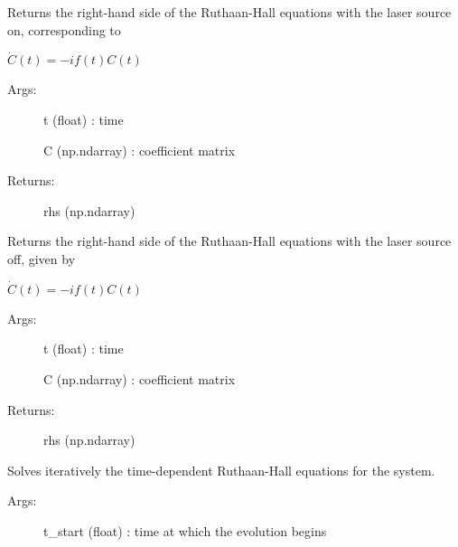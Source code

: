 \documentclass[letterpaper,10pt,english]{sphinxmanual}
\begin{document}
\begin{fulllineitems}
\begin{fulllineitems}
\end{fulllineitems}


\begin{fulllineitems}
\label{\detokenize{index:do.GHF.rhsf}}
Returns the right-hand side of the Ruthaan-Hall equations with the laser source on, corresponding to

\(\dot{C}(t) = -i f(t)C(t)\)
\begin{description}
\item[{Args:}] \leavevmode
t (float) : time

C (np.ndarray) : coefficient matrix

\item[{Returns:}] \leavevmode
rhs (np.ndarray)

\end{description}

\end{fulllineitems}


\begin{fulllineitems}
\label{\detokenize{index:do.GHF.rhsf_OFF}}
Returns the right-hand side of the Ruthaan-Hall equations with the laser source off, given by

\(\dot{C}(t) = -i f(t)C(t)\)
\begin{description}
\item[{Args:}] \leavevmode
t (float) : time

C (np.ndarray) : coefficient matrix

\item[{Returns:}] \leavevmode
rhs (np.ndarray)

\end{description}

\end{fulllineitems}


\begin{fulllineitems}
\label{\detokenize{index:do.GHF.solve_TDHF}}
Solves iteratively the time-dependent Ruthaan-Hall equations for the system.
\begin{description}
\item[{Args:}] \leavevmode
t\_start (float) : time at which the evolution begins


\end{description}
\end{fulllineitems}
\end{fulllineitems}
\end{document}
